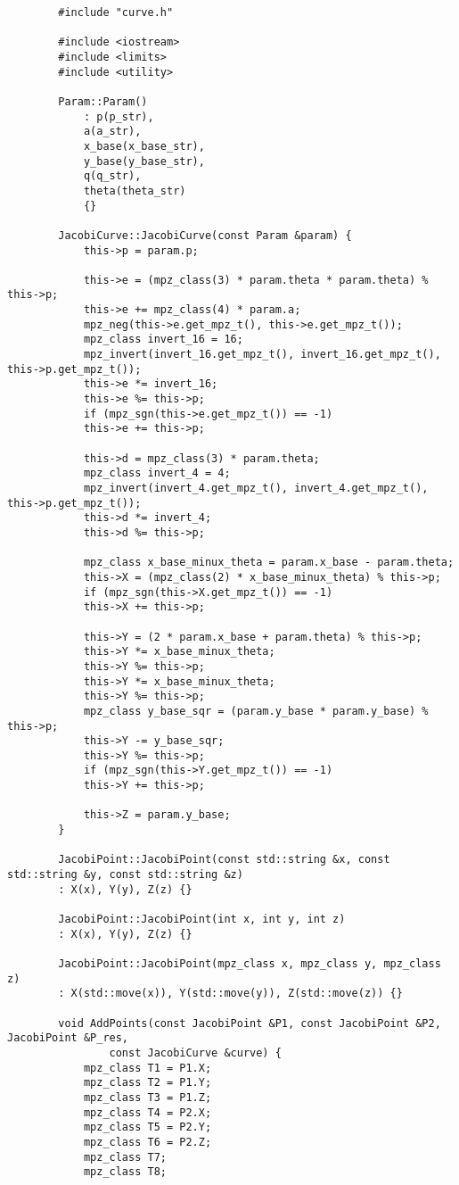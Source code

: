 \documentclass[a4paper,12pt]{article}
\begin{document}
	\begin{verbatim}
		#include "curve.h"
		
		#include <iostream>
		#include <limits>
		#include <utility>
		
		Param::Param()
			: p(p_str),
			a(a_str),
			x_base(x_base_str),
			y_base(y_base_str),
			q(q_str),
			theta(theta_str)
			{}
		
		JacobiCurve::JacobiCurve(const Param &param) {
			this->p = param.p;
			
			this->e = (mpz_class(3) * param.theta * param.theta) % this->p;
			this->e += mpz_class(4) * param.a;
			mpz_neg(this->e.get_mpz_t(), this->e.get_mpz_t());
			mpz_class invert_16 = 16;
			mpz_invert(invert_16.get_mpz_t(), invert_16.get_mpz_t(), this->p.get_mpz_t());
			this->e *= invert_16;
			this->e %= this->p;
			if (mpz_sgn(this->e.get_mpz_t()) == -1)
			this->e += this->p;
			
			this->d = mpz_class(3) * param.theta;
			mpz_class invert_4 = 4;
			mpz_invert(invert_4.get_mpz_t(), invert_4.get_mpz_t(), this->p.get_mpz_t());
			this->d *= invert_4;
			this->d %= this->p;
			
			mpz_class x_base_minux_theta = param.x_base - param.theta;
			this->X = (mpz_class(2) * x_base_minux_theta) % this->p;
			if (mpz_sgn(this->X.get_mpz_t()) == -1)
			this->X += this->p;
			
			this->Y = (2 * param.x_base + param.theta) % this->p;
			this->Y *= x_base_minux_theta;
			this->Y %= this->p;
			this->Y *= x_base_minux_theta;
			this->Y %= this->p;
			mpz_class y_base_sqr = (param.y_base * param.y_base) % this->p;
			this->Y -= y_base_sqr;
			this->Y %= this->p;
			if (mpz_sgn(this->Y.get_mpz_t()) == -1)
			this->Y += this->p;
			
			this->Z = param.y_base;
		}
		
		JacobiPoint::JacobiPoint(const std::string &x, const std::string &y, const std::string &z)
		: X(x), Y(y), Z(z) {}
		
		JacobiPoint::JacobiPoint(int x, int y, int z)
		: X(x), Y(y), Z(z) {}
		
		JacobiPoint::JacobiPoint(mpz_class x, mpz_class y, mpz_class z)
		: X(std::move(x)), Y(std::move(y)), Z(std::move(z)) {}
		
		void AddPoints(const JacobiPoint &P1, const JacobiPoint &P2, JacobiPoint &P_res, 
				const JacobiCurve &curve) {
			mpz_class T1 = P1.X;
			mpz_class T2 = P1.Y;
			mpz_class T3 = P1.Z;
			mpz_class T4 = P2.X;
			mpz_class T5 = P2.Y;
			mpz_class T6 = P2.Z;
			mpz_class T7;
			mpz_class T8;
			

\end{verbatim}
\end{document}
